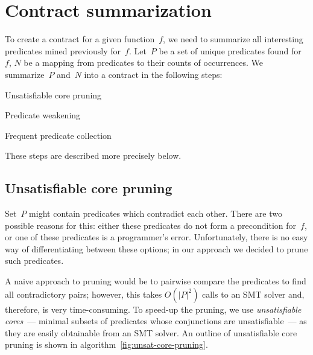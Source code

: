 \section{Contract summarization}\label{sec:summarization}

To create a contract for a given function~$f$, we need to summarize all interesting predicates mined previously for~$f$. Let~$P$ be a set of unique predicates found for~$f$, $N$ be a mapping from predicates to their counts of occurrences. We summarize~$P$ and~$N$ into a contract in the following steps:
%
\begin{itemize*}
\item Unsatisfiable core pruning
\item Predicate weakening
\item Frequent predicate collection
\end{itemize*}
%
These steps are described more precisely below.

\subsection{Unsatisfiable core pruning}

Set~$P$ might contain predicates which contradict each other. There are two possible reasons for this: either these predicates do not form a precondition for~$f$, or one of these predicates is a programmer's error. Unfortunately, there is no easy way of differentiating between these options; in our approach we decided to prune such predicates.

A naive approach to pruning would be to pairwise compare the predicates to find all contradictory pairs; however, this takes $O(|P|^2)$ calls to an SMT solver and, therefore, is very time-consuming. To speed-up the pruning, we use \emph{unsatisfiable cores}~--- minimal subsets of predicates whose conjunctions are unsatisfiable~--- as they are easily obtainable from an SMT solver. An outline of unsatisfiable core pruning is shown in algorithm~\ref{fig:unsat-core-pruning}.


